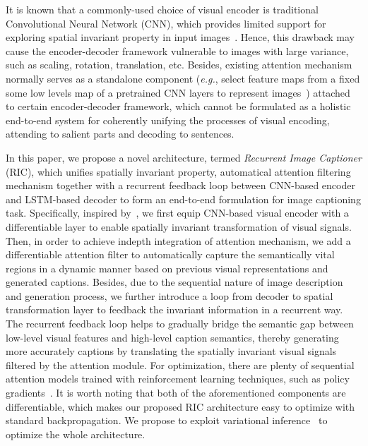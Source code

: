\documentclass[10pt,twocolumn,letterpaper]{article}
\begin{document}
	It is known that a commonly-used choice of visual encoder is traditional Convolutional Neural Network (CNN), which provides limited support for exploring spatial invariant property in input images~\cite{jaderberg2015spatial}. Hence, this drawback may cause the encoder-decoder framework vulnerable to images with large variance, such as scaling, rotation, translation, etc. Besides, existing attention mechanism normally serves as a standalone component (\emph{e.g.}, select feature maps from a fixed some low levels map of a pretrained CNN layers to represent images~\cite{xu2015show}) attached to certain encoder-decoder framework, which cannot be formulated as a holistic end-to-end system for coherently unifying the processes of visual encoding, attending to salient parts and decoding to sentences.
	
	
	
	In this paper, we propose a novel architecture, termed \emph{Recurrent Image Captioner} (RIC), which unifies spatially invariant property, automatical attention filtering mechanism together with a recurrent feedback loop between CNN-based encoder and LSTM-based decoder to form an end-to-end formulation for image captioning task. Specifically, inspired by~\cite{jaderberg2015spatial}, we first equip CNN-based visual encoder with a differentiable layer to enable spatially invariant transformation of visual signals. Then, in order to achieve indepth integration of attention mechanism, we add a differentiable attention filter to automatically capture the semantically vital regions in a dynamic manner based on previous visual representations and generated captions. Besides, due to the sequential nature of image description and generation process, we further introduce a loop from decoder to spatial transformation layer to feedback the invariant information in a recurrent way. The recurrent feedback loop helps to gradually bridge the semantic gap between low-level visual features and high-level caption semantics, thereby generating more accurately captions by translating the spatially invariant visual signals filtered by the attention module. For optimization, there are plenty of sequential attention models trained with reinforcement learning techniques, such as policy gradients~\cite{mnih2014recurrent}. It is worth noting that both of the aforementioned components are differentiable, which makes our proposed RIC architecture easy to optimize with standard backpropagation. We propose to exploit variational inference~\cite{frigola2014variational} to optimize the whole architecture.
	
\end{document}
